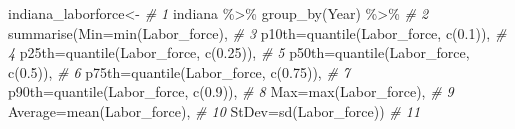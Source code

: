 \documentclass[
]{book}
\newenvironment{Shaded}{\begin{snugshade}}{\end{snugshade}}
\newcommand{\AttributeTok}[1]{\textcolor[rgb]{0.77,0.63,0.00}{#1}}
\newcommand{\CommentTok}[1]{\textcolor[rgb]{0.56,0.35,0.01}{\textit{#1}}}
\newcommand{\FloatTok}[1]{\textcolor[rgb]{0.00,0.00,0.81}{#1}}
\newcommand{\FunctionTok}[1]{\textcolor[rgb]{0.00,0.00,0.00}{#1}}
\newcommand{\NormalTok}[1]{#1}
\newcommand{\OtherTok}[1]{\textcolor[rgb]{0.56,0.35,0.01}{#1}}
\newcommand{\SpecialCharTok}[1]{\textcolor[rgb]{0.00,0.00,0.00}{#1}}
\begin{document}
\begin{Shaded}
\begin{Highlighting}[]
\NormalTok{indiana\_laborforce}\OtherTok{\textless{}{-}}                       \CommentTok{\# 1}
\NormalTok{  indiana }\SpecialCharTok{\%\textgreater{}\%} \FunctionTok{group\_by}\NormalTok{(Year) }\SpecialCharTok{\%\textgreater{}\%}           \CommentTok{\# 2}
  \FunctionTok{summarise}\NormalTok{(}\AttributeTok{Min=}\FunctionTok{min}\NormalTok{(Labor\_force),          }\CommentTok{\# 3}
    \AttributeTok{p10th=}\FunctionTok{quantile}\NormalTok{(Labor\_force, }\FunctionTok{c}\NormalTok{(}\FloatTok{0.1}\NormalTok{)),   }\CommentTok{\# 4}
    \AttributeTok{p25th=}\FunctionTok{quantile}\NormalTok{(Labor\_force, }\FunctionTok{c}\NormalTok{(}\FloatTok{0.25}\NormalTok{)),  }\CommentTok{\# 5}
    \AttributeTok{p50th=}\FunctionTok{quantile}\NormalTok{(Labor\_force, }\FunctionTok{c}\NormalTok{(}\FloatTok{0.5}\NormalTok{)),   }\CommentTok{\# 6}
    \AttributeTok{p75th=}\FunctionTok{quantile}\NormalTok{(Labor\_force, }\FunctionTok{c}\NormalTok{(}\FloatTok{0.75}\NormalTok{)),  }\CommentTok{\# 7}
    \AttributeTok{p90th=}\FunctionTok{quantile}\NormalTok{(Labor\_force, }\FunctionTok{c}\NormalTok{(}\FloatTok{0.9}\NormalTok{)),   }\CommentTok{\# 8}
    \AttributeTok{Max=}\FunctionTok{max}\NormalTok{(Labor\_force),                  }\CommentTok{\# 9}
    \AttributeTok{Average=}\FunctionTok{mean}\NormalTok{(Labor\_force),            }\CommentTok{\# 10}
    \AttributeTok{StDev=}\FunctionTok{sd}\NormalTok{(Labor\_force))                }\CommentTok{\# 11}
\end{Highlighting}
\end{Shaded}
\end{document}
